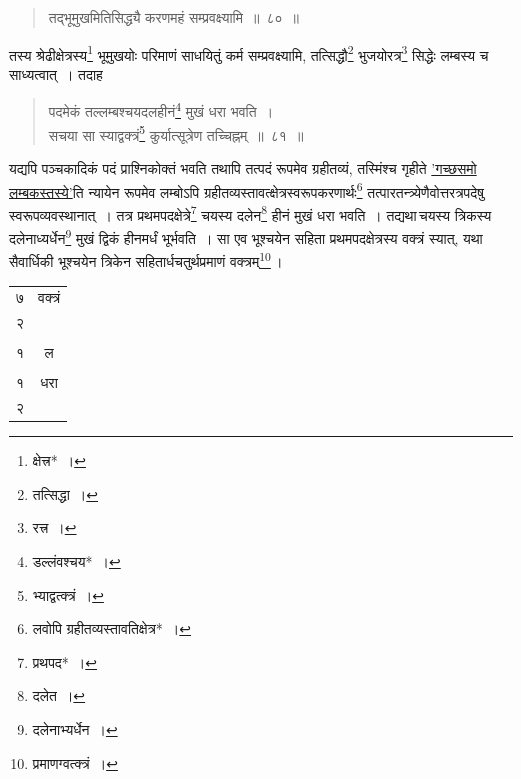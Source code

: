 \documentclass[10pt, openany]{book}
\begin{document}
{\begin{quote}

{\bs तद्भूमुखमितिसिद्ध्यै करणमहं सम्प्रवक्ष्यामि~॥~८०~॥} \end{quote}

{तस्य श्रेढीक्षेत्रस्य\renewcommand{\thefootnote}{\s ४}\footnote{\s *क्षेत्त्र*~।} भूमुखयोः परिमाणं साधयितुं कर्म
सम्प्रवक्ष्यामि, तत्सिद्धौ\renewcommand{\thefootnote}{\s ५}\footnote{\s तत्सिद्धा~।}}
{भुजयोरत्र\renewcommand{\thefootnote}{\s ६}\footnote{\s *रत्त्र~।} सिद्धेः लम्बस्य च साध्यत्वात्~। तदाह\textemdash} 

 \label{81}
\begin{quote}

{\bs पदमेकं तल्लम्बश्चयदलहीनं\renewcommand{\thefootnote}{\s ७}\footnote{\s डल्लंवश्चय*~।} मुखं धरा भवति~।\\
 सचया सा स्याद्वक्त्रं\renewcommand{\thefootnote}{\s ८}\footnote{\s भ्याद्वत्क्त्रं~।} कुर्यात्सूत्रेण तच्चिह्नम्~॥~८१~॥}\end{quote}

{यद्यपि पञ्चकादिकं पदं प्राश्निकोक्तं भवति तथापि तत्पदं रूपमेव
ग्रहीतव्यं, तस्मिंश्च}
{गृहीते \hyperref[79]{'गच्छसमो लम्बकस्तस्ये'}ति न्यायेन रूपमेव लम्बोऽपि
ग्रहीतव्यस्तावत्क्षेत्रस्वरूपकरणार्थः\renewcommand{\thefootnote}{\s ९}\footnote{\s लवोपि
ग्रहीतव्यस्तावतिक्षेत्र*~।}}
{तत्पारतन्त्र्येणैवोत्तरत्रपदेषु स्वरूपव्यवस्थानात्~। तत्र
प्रथमपदक्षेत्रे\renewcommand{\thefootnote}{\s १०}\footnote{\s प्रथपद*~।} चयस्य दलेन\renewcommand{\thefootnote}{\s ११}\footnote{\s दलेत~।} हीनं मुखं धरा}
{भवति~। तद्यथा\textendash \,चयस्य त्रिकस्य दलेनाध्यर्धेन\renewcommand{\thefootnote}{\s १२}\footnote{\s दलेनाभ्यर्धेन~।} मुखं द्विकं हीनमर्धं
भूर्भवति~। सा एव भूश्चयेन}
{सहिता प्रथमपदक्षेत्रस्य वक्त्रं स्यात्, यथा सैवार्धिकी भूश्चयेन त्रिकेन
सहितार्धचतुर्थप्रमाणं}
{वक्त्रम्\renewcommand{\thefootnote}{\s १३}\footnote{\s *प्रमाणग्वत्क्त्रं~।}\,।}

\begin{center}{\begin{tabular}{|c c|}७  & वक्त्रं\\
 २ & {} \\
 \hline 
 & \\
 १ & ल \\
 \hline 
 & \\
१ & धरा \\
 २  & {}\\\hline
 \end{tabular}}
 \end{center}

}
\end{document}
